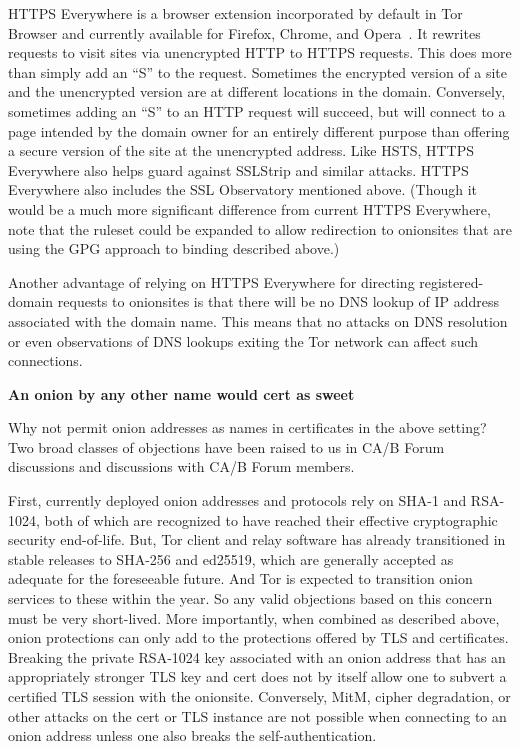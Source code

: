 \documentclass[10pt]{styles/IEEEtran}
\newcommand{\point}[1]{\vspace{2mm} \noindent\textbf{#1}}
\begin{document}
HTTPS Everywhere is a browser extension incorporated by default in Tor
Browser and currently available for Firefox, Chrome, and
Opera~\cite{https-everywhere}. It rewrites requests to visit sites via
unencrypted HTTP to HTTPS requests. This does more than simply add an
``S'' to the request. Sometimes the encrypted version of a site and
the unencrypted version are at different locations in the domain.
Conversely, sometimes adding an ``S'' to an HTTP request will
succeed, but will connect to a page intended by the domain owner for an
entirely different purpose than offering a secure version of the site
at the unencrypted address.  Like HSTS, HTTPS Everywhere also helps
guard against SSLStrip and similar attacks. HTTPS Everywhere
also includes the SSL Observatory mentioned above.
(Though it would be a much more significant difference from current HTTPS
Everywhere, note that the ruleset could be expanded to allow redirection
to onionsites that are using the GPG approach to binding described
above.)

Another advantage of relying on HTTPS Everywhere for directing
registered-domain requests to onionsites is that there will
be no DNS lookup of IP address associated with the domain name.
This means that no attacks on DNS resolution or even observations
of DNS lookups exiting the Tor network can affect such connections.

\point{An onion by any other name would cert as sweet}

Why not permit onion addresses as names in certificates in the above
setting? Two broad classes of objections have been raised to us in
CA/B Forum discussions and discussions with CA/B Forum members.

First, currently deployed onion addresses and protocols rely on SHA-1
and RSA-1024, both of which are recognized to have reached their
effective cryptographic security end-of-life. But, Tor client and
relay software has already transitioned in stable releases to SHA-256
and ed25519, which are generally accepted as adequate for the
foreseeable future. And Tor is expected to transition onion services
to these within the year. So any valid objections based on this
concern must be very short-lived.  More importantly, when combined as
described above, onion protections can only add to the
protections offered by TLS and certificates. Breaking the
private RSA-1024 key associated with an onion address that has an
appropriately stronger TLS key and cert does not by itself allow one
to subvert a certified TLS session with the onionsite. Conversely,
MitM, cipher degradation, or other attacks on the cert or TLS instance
are not possible when connecting to an onion address unless one also breaks
the self-authentication.
\end{document}

